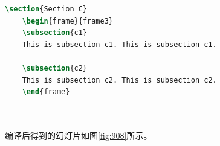 \begin{lstlisting}[language=TeX]
    \section{Section C}
    \begin{frame}{frame3}
    \subsection{c1}
    This is subsection c1. This is subsection c1.

    \subsection{c2}
    This is subsection c2. This is subsection c2.
    \end{frame}

    
\end{lstlisting}

编译后得到的幻灯片如图\ref{fig:908}所示。

